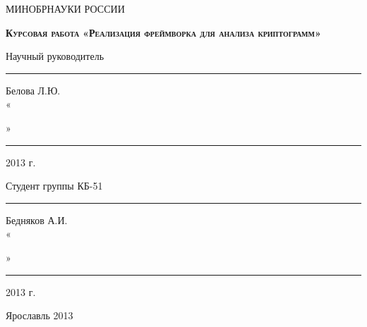 \begin{titlepage}
    \begin{center}
        МИНОБРНАУКИ РОССИИ
        \linebreak

        \vspace{48pt}{
        Федеральное государственное бюджетное образовательное 
        учреждение высшего профессионального образования
        \linebreak
        «Ярославский государственный университет им. П.Г. Демидова»
        }
        \linebreak

        \vspace{1em}{
        Кафедра компьютерной безопасности и
        математических методов обработки информации
        }
    \end{center}

    \vspace{1em}

    \begin{center}
        \textsc{\textbf{Курсовая работа}}
        \linebreak
        \textsc{\textbf{«Реализация фреймворка для анализа криптограмм»}}
    \end{center}

    \vspace{6em}

	\begin{flushright}
        Научный руководитель \\
        \rule{2,2cm}{1pt} Белова Л.Ю. \\
        «\rule{0,5cm}{1pt}» \rule{2,5cm}{1pt} 2013 г.

        \vspace{1.5em}

        Студент группы КБ-51 \\
        \rule{2cm}{1pt} Бедняков А.И. \\
        «\rule{0,5cm}{1pt}» \rule{2,5cm}{1pt} 2013 г.
	\end{flushright}

    \vspace{\fill}

    \begin{center}
        Ярославль 2013
    \end{center}
\end{titlepage}
